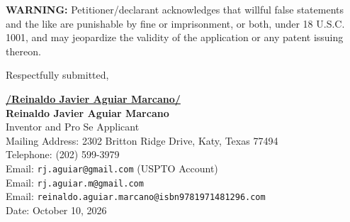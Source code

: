 \documentclass[11pt,letterpaper]{article}
\begin{document}
\vspace{0.4cm}
\textbf{WARNING:} Petitioner/declarant acknowledges that willful false statements and the like are punishable by fine or imprisonment, or both, under 18 U.S.C. 1001, and may jeopardize the validity of the application or any patent issuing thereon.

\vspace{0.8cm}
\begin{singlespace}
\noindent Respectfully submitted, \par\vspace{1.2cm}
\underline{\textbf{/Reinaldo Javier Aguiar Marcano/}} \\
\textbf{Reinaldo Javier Aguiar Marcano} \\
Inventor and Pro Se Applicant \\
Mailing Address: 2302 Britton Ridge Drive, Katy, Texas 77494 \\
Telephone: (202) 599-3979 \\
Email: \texttt{rj.aguiar@gmail.com} (USPTO Account) \\
Email: \texttt{rj.aguiar.m@gmail.com} \\
Email: \texttt{reinaldo.aguiar.marcano@isbn9781971481296.com} \\
Date: October 10, 2026
\end{singlespace}
\end{document}
